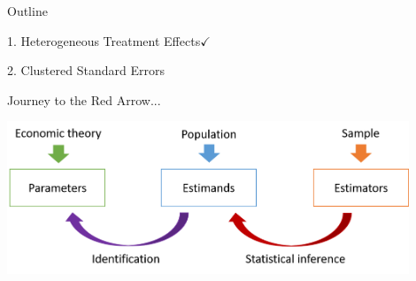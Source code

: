 \documentclass[11pt,english]{beamer}
\begin{document}
\begin{frame}{Outline}

\textcolor{red!75!green!50!blue!25!gray}{1. Heterogeneous Treatment Effects}$\checkmark$
\vspace{0.8cm}

2. Clustered Standard Errors

\end{frame}

\begin{frame}{Journey to the Red Arrow...}
\begin{center}
	\includegraphics[width=0.9\textwidth]{figures/BigPicture.png}
\end{center}
\end{frame}
\end{document}
